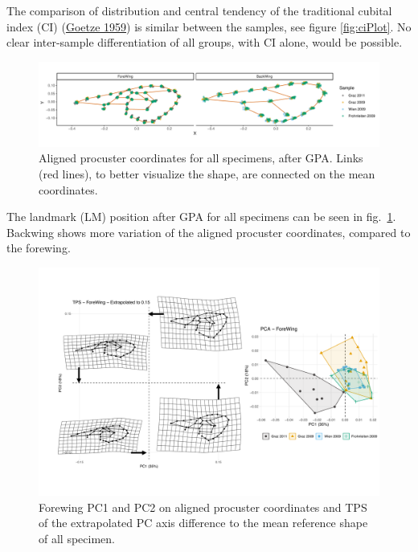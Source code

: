 \documentclass[
]{article}
\begin{document}
The comparison of distribution and central tendency of the traditional cubital index (CI) (\protect\hyperlink{ref-goetze1959}{Goetze 1959}) is similar between the samples, see figure \ref{fig:ciPlot}. No clear inter-sample differentiation of all groups, with CI alone, would be possible.



\begin{figure}[H]

{\centering \includegraphics[width=1\linewidth,]{images/pcPlot} 

}

\caption{Aligned procuster coordinates for all specimens, after GPA. Links (red lines), to better visualize the shape, are connected on the mean coordinates.}\label{fig:pcPlot}
\end{figure}

The landmark (LM) position after GPA for all specimens can be seen in fig.~\ref{fig:pcPlot}. Backwing shows more variation of the aligned procuster coordinates, compared to the forewing.



\begin{figure}[H]

{\centering \includegraphics[width=0.8\linewidth,]{images/fwPCA} 

}

\caption{Forewing PC1 and PC2 on aligned procuster coordinates and TPS of the extrapolated PC axis difference to the mean reference shape of all specimen.}\label{fig:fwPCA}
\end{figure}
\end{document}
